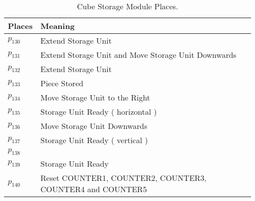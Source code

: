 \begin{table}[H]
\caption{Cube Storage Module Places.}
\centering
\begin{tabular}{M{5cm}M{10cm}}
Places & Meaning\\
\hline
\hyperlink{partialNet:p1301}{\hypertarget{partialTable:p130}{$p_{130}$}} & Extend Storage Unit\\
\hyperlink{partialNet:p1311}{\hypertarget{partialTable:p131}{$p_{131}$}} & Extend Storage Unit and Move Storage Unit Downwards\\
\hyperlink{partialNet:p1321}{\hypertarget{partialTable:p132}{$p_{132}$}} & Extend Storage Unit\\
\hyperlink{partialNet:p1331}{\hypertarget{partialTable:p133}{$p_{133}$}} & Piece Stored\\
\hyperlink{partialNet:p1341}{\hypertarget{partialTable:p134}{$p_{134}$}} & Move Storage Unit to the Right\\
\hyperlink{partialNet:p1351}{\hypertarget{partialTable:p135}{$p_{135}$}} & Storage Unit Ready ( horizontal )\\
\hyperlink{partialNet:p1361}{\hypertarget{partialTable:p136}{$p_{136}$}} & Move Storage Unit Downwards\\
\hyperlink{partialNet:p1371}{\hypertarget{partialTable:p137}{$p_{137}$}} & Storage Unit Ready ( vertical )\\
\hyperlink{partialNet:p1381}{\hypertarget{partialTable:p138}{$p_{138}$}} & \\
\hyperlink{partialNet:p1391}{\hypertarget{partialTable:p139}{$p_{139}$}} & Storage Unit Ready\\
\hyperlink{partialNet:p1401}{\hypertarget{partialTable:p140}{$p_{140}$}} & Reset COUNTER1, COUNTER2, COUNTER3, COUNTER4 and COUNTER5\\
\end{tabular}
\end{table}
